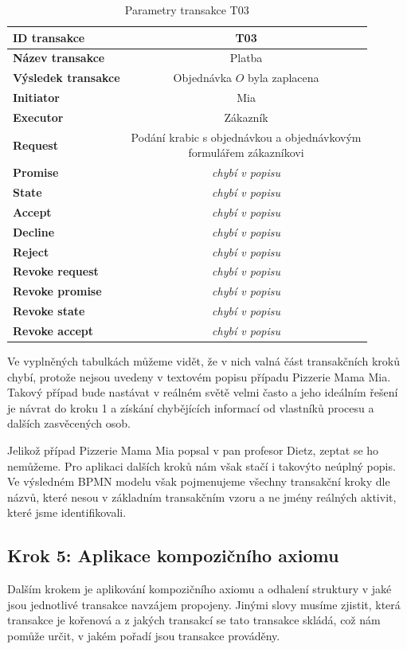 \documentclass[]{article}
\begin{document}
\begin{table} [H] \centering
\begin{tabular}{|>{\bfseries} l| | c |}
\hline
  ID transakce & T03 \\
\hline
  Název transakce & Platba  \\
\hline
  Výsledek transakce & Objednávka $O$ byla zaplacena \\
\hline
  Initiator & Mia \\
\hline
  Executor & Zákazník \\
\hline
\hline
  Request & \makecell{Podání krabic s objednávkou a objednávkovým\\ formulářem zákazníkovi} \\
\hline
  Promise &  \textit{chybí v popisu} \\
\hline
  State & \textit{chybí v popisu} \\
\hline
  Accept & \textit{chybí v popisu} \\
\hline
\hline
  Decline &  \textit{chybí v popisu} \\
\hline
  Reject & \textit{chybí v popisu} \\
\hline
\hline
  Revoke request & \textit{chybí v popisu} \\
\hline
  Revoke promise & \textit{chybí v popisu} \\
\hline
  Revoke state & \textit{chybí v popisu} \\
\hline
  Revoke accept & \textit{chybí v popisu} \\
\hline
\end{tabular}
\caption{Parametry transakce T03}
\label{tab:t03_param}
\end{table}

Ve vyplněných tabulkách můžeme vidět, že v nich valná část transakčních kroků chybí, protože nejsou uvedeny v textovém popisu případu Pizzerie Mama Mia. Takový případ bude nastávat v reálném světě velmi často a jeho ideálním řešení je návrat do kroku 1 a získání chybějících informací od vlastníků procesu a dalších zasvěcených osob.

Jelikož případ Pizzerie Mama Mia popsal v \cite{Dietz2006} pan profesor Dietz, zeptat se ho nemůžeme. Pro aplikaci dalších kroků nám však stačí i takovýto neúplný popis. Ve výsledném BPMN modelu však pojmenujeme všechny transakční kroky dle názvů, které nesou v základním transakčním vzoru a ne jmény reálných aktivit, které jsme identifikovali.

\subsection{Krok 5: Aplikace kompozičního axiomu}
Dalším krokem je aplikování kompozičního axiomu a odhalení struktury v jaké jsou jednotlivé transakce navzájem propojeny. Jinými slovy musíme zjistit, která transakce je kořenová a z jakých transakcí se tato transakce skládá, což nám pomůže určit, v jakém pořadí jsou transakce prováděny.
\end{document}
